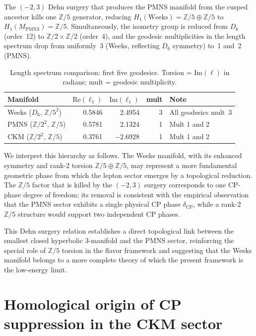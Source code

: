 \documentclass[12pt]{article}
\theoremstyle{definition}
\begin{document}
The $(-2,3)$ Dehn surgery that produces the PMNS manifold from the
cusped ancestor kills one $\mathbb{Z}/5$ generator, reducing
$H_1(\mathrm{Weeks}) = \mathbb{Z}/5 \oplus \mathbb{Z}/5$ to
$H_1(M_\mathrm{PMNS}) = \mathbb{Z}/5$.
Simultaneously, the isometry group is reduced from $D_6$ (order~12)
to $\mathbb{Z}/2 \times \mathbb{Z}/2$ (order~4), and the geodesic
multiplicities in the length spectrum drop from uniformly~3
(Weeks, reflecting $D_6$ symmetry) to~1 and~2 (PMNS).

\begin{table}[h]
\centering
\caption{Length spectrum comparison: first five geodesics.
Torsion = $\mathrm{Im}(\ell)$ in radians; mult = geodesic multiplicity.}
\label{tab:length_spectra}
\begin{tabular}{lrrrl}
\toprule
Manifold & $\mathrm{Re}(\ell_1)$ & $\mathrm{Im}(\ell_1)$ & mult & Note \\
\midrule
Weeks ($D_6$, $\mathbb{Z}/5^2$)  & 0.5846 & 2.4954 & 3 & All geodesics mult~3 \\
PMNS ($\mathbb{Z}/2^2$, $\mathbb{Z}/5$) & 0.5781 & 2.1324 & 1 & Mult 1 and 2 \\
CKM  ($\mathbb{Z}/2^2$, $\mathbb{Z}/5$) & 0.3761 & $-2.6928$ & 1 & Mult 1 and 2 \\
\bottomrule
\end{tabular}
\end{table}

We interpret this hierarchy as follows.
The Weeks manifold, with its enhanced symmetry and rank-2 torsion
$\mathbb{Z}/5 \oplus \mathbb{Z}/5$, may represent a more fundamental
geometric phase from which the lepton sector emerges by a topological
reduction. The $\mathbb{Z}/5$ factor that is killed by the
$(-2,3)$ surgery corresponds to one CP-phase degree of freedom; its
removal is consistent with the empirical observation that the PMNS
sector exhibits a single physical CP phase $\delta_\mathrm{CP}$,
while a rank-2 $\mathbb{Z}/5$ structure would support two independent
CP phases.

This Dehn surgery relation establishes a direct topological link
between the smallest closed hyperbolic 3-manifold and the PMNS sector,
reinforcing the special role of $\mathbb{Z}/5$ torsion in the flavor
framework and suggesting that the Weeks manifold belongs to a more
complete theory of which the present framework is the low-energy limit.


\section{Homological origin of CP suppression in the CKM sector}
\label{sec:homological_cp}
\end{document}
